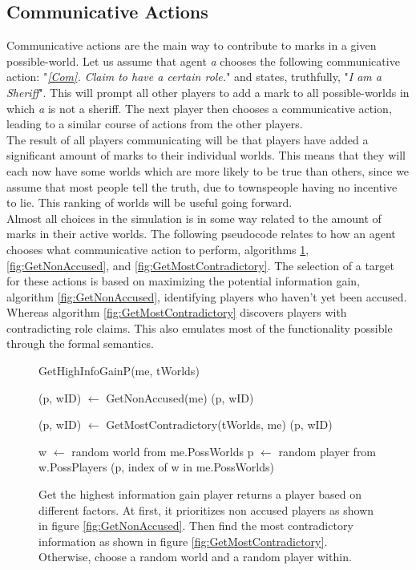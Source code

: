 \subsection{Communicative Actions}\label{CommunicativeActions}
Communicative actions are the main way to contribute to marks in a given
possible-world. Let us assume that agent \textit{a} chooses the following
communicative action: "\textit{\ref{Com}. Claim to have a certain role.}" and
states, truthfully, "\textit{I am a Sheriff}". This will prompt all other
players to add a mark to all possible-worlds in which \textit{a} is not a
sheriff. The next player then chooses a communicative action, leading to a
similar course of actions from the other players. \\ The result of all players
communicating will be that players have added a significant amount of marks to
their individual worlds. This means that they will each now have some worlds
which are more likely to be true than others, since we assume that most people
tell the truth, due to townspeople having no incentive to lie. This ranking of
worlds will be useful going forward.\\ Almost all choices in the simulation is
in some way related to the amount of marks in their active worlds. The
following pseudocode relates to how an agent chooses what communicative action
to perform, algorithms \ref{fig:GetHighInfoGainP}, \ref{fig:GetNonAccused}, and
\ref{fig:GetMostContradictory}. The selection of a target for these actions is
based on maximizing the potential information gain, algorithm
\ref{fig:GetNonAccused}, identifying players who haven't yet been accused.
Whereas algorithm \ref{fig:GetMostContradictory} discovers players with
contradicting role claims. This also emulates most of the functionality possible through the formal semantics.\\
\begin{figure}[H]
	\begin{algorithm}[H]
		\caption{GetHighInfoGainP(me, tWorlds)}
		\begin{algorithmic}
			\State (p, wID) $\gets$ GetNonAccused(me)
			\State \Return (p, wID)
			\EndIf
			\EndIf

			\State (p, wID) $\gets$ GetMostContradictory(tWorlds, me)
			\State \Return (p, wID)
			\EndIf

			\State w $\gets$ random world from me.PossWorlds
			\State p $\gets$ random player from w.PossPlayers
			\State \Return (p, index of w in me.PossWorlds)
		\end{algorithmic}
	\end{algorithm}
	\caption{Get the highest information gain player returns a player based on different factors.
		At first, it prioritizes non accused players as shown in figure \ref{fig:GetNonAccused}.
		Then find the most contradictory information as shown in figure \ref{fig:GetMostContradictory}.
		Otherwise, choose a random world and a random player within.
	}
	\label{fig:GetHighInfoGainP}
\end{figure}

